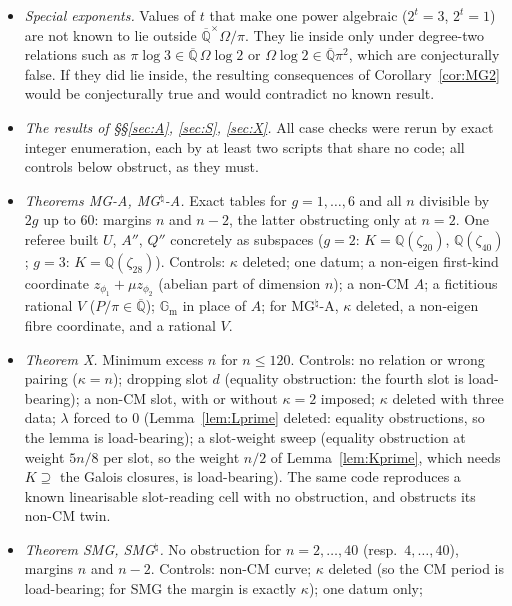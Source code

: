 \documentclass[11pt]{amsart}
\theoremstyle{definition}
\newcommand{\Qb}{\overline{\mathbb{Q}}}
\newcommand{\C}{\mathbb{C}}
\newcommand{\Q}{\mathbb{Q}}
\newcommand{\Gm}{\mathbb{G}_{\mathrm m}}
\begin{document}
\begin{itemize}
subspace. So a line $V=\C(1,s)$ meets it only if $s\in K$, where the statement is false and the method is silent. With a
logarithm in place of the elliptic period ($\kappa=0$), the same count reproduces the six exponentials theorem (a
calibration).
\item \emph{Special exponents.} Values of $t$ that make one power algebraic ($2^t=3$, $2^t=1$) are not known to lie
outside $\Qb^\times\Omega/\pi$. They lie inside only under degree-two relations such as $\pi\log3\in\Qb\,\Omega\log2$ or
$\Omega\log2\in\Qb\pi^2$, which are conjecturally false. If they did lie inside, the resulting consequences of
Corollary~\ref{cor:MG2} would be conjecturally true and would contradict no known result.
\item \emph{The results of \S\S\ref{sec:A}, \ref{sec:S}, \ref{sec:X}.} All case checks were rerun by exact integer
enumeration, each by at least two scripts that share no code; all controls below obstruct, as they must.
\item \emph{Theorems MG-A, MG$^\natural$-A.} Exact tables for $g=1,\dots,6$ and all $n$ divisible by $2g$ up to $60$:
margins $n$ and $n-2$, the latter obstructing only at $n=2$. One referee built $U$, $A''$, $Q''$ concretely as subspaces
($g=2$: $K=\Q(\zeta_{20})$, $\Q(\zeta_{40})$; $g=3$: $K=\Q(\zeta_{28})$). Controls: $\kappa$ deleted; one datum; a
non-eigen first-kind coordinate $z_{\phi_1}+\mu z_{\phi_2}$ (abelian part of dimension $n$); a non-CM $A$; a fictitious
rational $V$ ($P/\pi\in\Qb$); $\Gm$ in place of $A$; for MG$^\natural$-A, $\kappa$ deleted, a non-eigen fibre coordinate, and
a rational $V$.
\item \emph{Theorem X.} Minimum excess $n$ for $n\le120$. Controls: no relation or wrong pairing ($\kappa=n$); dropping
slot $d$ (equality obstruction: the fourth slot is load-bearing); a non-CM slot, with or without $\kappa=2$ imposed; $\kappa$
deleted with three data; $\lambda$ forced to $0$ (Lemma~\ref{lem:Lprime} deleted: equality obstructions, so the lemma is
load-bearing); a slot-weight sweep (equality obstruction at weight $5n/8$ per slot, so the weight $n/2$ of
Lemma~\ref{lem:Kprime}, which needs $K\supseteq$ the Galois closures, is load-bearing). The same code reproduces a known
linearisable slot-reading cell with no obstruction, and obstructs its non-CM twin.
\item \emph{Theorem SMG, SMG$^\natural$.} No obstruction for $n=2,\dots,40$ (resp.\ $4,\dots,40$), margins $n$ and $n-2$. Controls:
non-CM curve; $\kappa$ deleted (so the CM period is load-bearing; for SMG the margin is exactly $\kappa$); one datum only;

\end{itemize}
\end{document}
